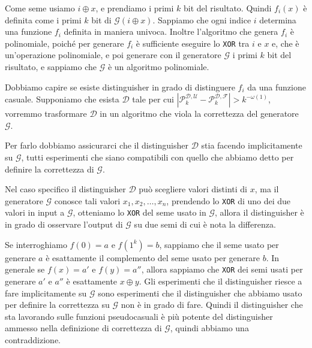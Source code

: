 \begin{figure}[H]
  \centering
\end{figure}
Come seme usiamo $i \oplus x$, e prendiamo i primi $k$ bit del risultato. Quindi 
$f_i(x)$ è definita come i primi $k$ bit di $\mathcal{G}(i \oplus x)$.
Sappiamo che ogni 
indice $i$ determina una funzione $f_i$ definita in maniera univoca.
Inoltre l'algoritmo che genera $f_i$ è polinomiale, poiché per generare $f_i$
è sufficiente eseguire lo \texttt{XOR} tra $i$ e $x$ e, che è un'operazione polinomiale,
e poi generare con il generatore $\mathcal{G}$ i primi $k$ bit del risultato, e sappiamo che 
$\mathcal{G}$ è un algoritmo polinomiale.

Dobbiamo capire se esiste distinguisher in grado di distinguere $f_i$ da una funzione
casuale. Supponiamo che esista $\mathcal{D}$ tale per cui 
$\left| \mathcal{P}_k^{\mathcal{D}, \mathcal{U}} - \mathcal{P}_k^{\mathcal{D}, \mathcal{F}}
\right| > k^{-\omega(1)}$, vorremmo trasformare $\mathcal{D}$ in un algoritmo
che viola la correttezza del generatore $\mathcal{G}$.

Per farlo dobbiamo assicurarci che il distinguisher $\mathcal{D}$ stia facendo 
implicitamente su $\mathcal{G}$, tutti esperimenti che siano compatibili con quello 
che abbiamo detto per definire la correttezza di $\mathcal{G}$.

Nel caso specifico il distinguisher $\mathcal{D}$ può scegliere 
valori distinti di $x$, ma il generatore $\mathcal{G}$ conosce tali 
valori $x_1, x_2, \dots, x_n$, prendendo lo \texttt{XOR} di uno dei 
due valori in input a $\mathcal{G}$, otteniamo lo \texttt{XOR} 
del seme usato in $\mathcal{G}$, allora il distinguisher è in grado 
di osservare l'output di $\mathcal{G}$ su due semi di cui è nota 
la differenza.

Se interroghiamo $f(0) = a$ e $f(1^k)= b$, sappiamo che il seme
usato per generare $a$ è esattamente il complemento del seme usato 
per generare $b$. In generale se $f(x) = a'$ e $f(y)=a''$, allora
sappiamo che \texttt{XOR} dei semi usati per generare $a'$ e $a''$
è esattamente $x \oplus y$. Gli esperimenti che il distinguisher
riesce a fare implicitamente su $\mathcal{G}$ sono esperimenti 
che il distinguisher che abbiamo usato per definire la correttezza
su $\mathcal{G}$ non è in grado di fare.
Quindi il distinguisher che sta lavorando sulle funzioni pseudocasuali 
è più potente del distinguisher ammesso nella definizione di
correttezza di $\mathcal{G}$, quindi abbiamo una contraddizione.

